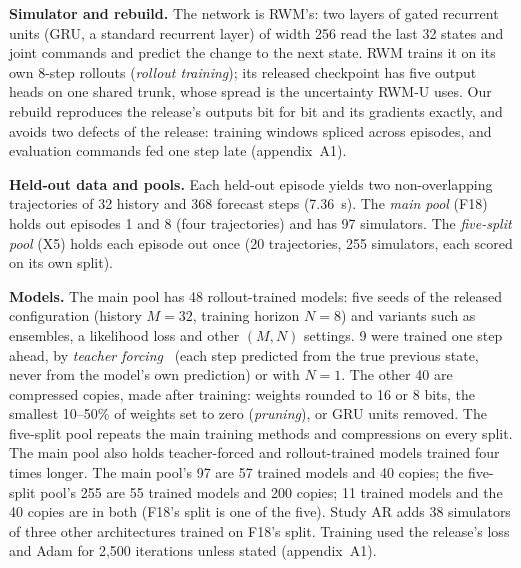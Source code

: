 \textbf{Simulator and rebuild.} The network is RWM's: two layers of gated recurrent units (GRU, a standard recurrent
layer) of width 256 read the last 32 states and joint commands and predict the change to the next state. RWM trains it
on its own 8-step rollouts (\emph{rollout training}); its released checkpoint has five output heads on one shared
trunk, whose spread is the uncertainty RWM-U uses. Our rebuild reproduces the release's outputs bit for bit and its
gradients exactly, and avoids two defects of the release: training windows spliced across episodes, and evaluation
commands fed one step late (appendix~A1).

\textbf{Held-out data and pools.} Each held-out episode yields two non-overlapping trajectories of 32 history and 368
forecast steps (7.36~s). The \emph{main pool} (F18) holds out episodes 1 and 8 (four trajectories) and has 97
simulators. The \emph{five-split pool} (X5) holds each episode out once (20 trajectories, 255 simulators, each
scored on its own split).

\textbf{Models.} The main pool has 48 rollout-trained models: five seeds of the released configuration (history
$M=32$, training horizon $N=8$) and variants such as ensembles, a likelihood loss and other $(M,N)$ settings. 9
were trained one step ahead, by \emph{teacher forcing}~\cite{williams1989} (each step predicted from the true previous
state, never from the model's own prediction) or with $N=1$. The other 40 are compressed copies, made after
training: weights rounded to 16 or 8 bits, the smallest 10--50\% of weights set to zero (\emph{pruning}), or GRU units
removed. The five-split pool repeats the main training methods and compressions on every split. The main pool also holds
teacher-forced and rollout-trained models trained four times longer.
The main pool's 97 are 57 trained models and 40 copies; the
five-split pool's 255 are 55 trained models and 200 copies; 11 trained models and the 40
copies are in both (F18's split is one of the five). Study AR adds 38 simulators of three other
architectures trained on F18's split. Training used the release's loss and Adam for 2{,}500 iterations unless stated (appendix~A1).

